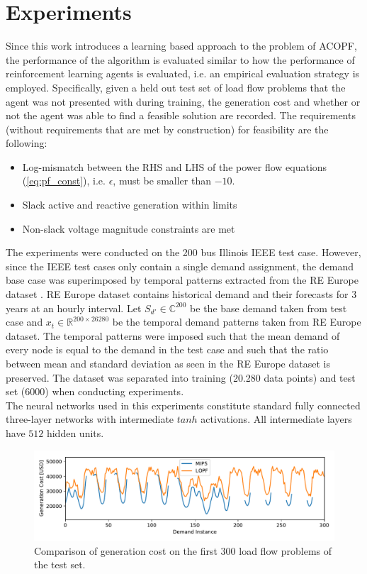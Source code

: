 \section{Experiments}
\label{sec:LOPFexperiments}
Since this work introduces a learning based approach to the problem of ACOPF, the performance of the algorithm is evaluated similar to how the performance of reinforcement learning agents is evaluated, i.e. an empirical evaluation strategy is employed. Specifically, given a held out test set of load flow problems that the agent was not presented with during training, the generation cost and whether or not the agent was able to find a feasible solution are recorded. The requirements (without requirements that are met by construction) for feasibility are the following:
\begin{itemize}
    \item Log-mismatch between the RHS and LHS of the power flow equations (\ref{eq:pf_const}), i.e. $\epsilon$, must be smaller than $-10$.
    \item Slack active and reactive generation within limits
    \item Non-slack voltage magnitude constraints are met
\end{itemize}

The experiments were conducted on the 200 bus Illinois IEEE test case. However, since the IEEE test cases only contain a single demand assignment, the demand base case was superimposed by temporal patterns extracted from the RE Europe dataset \cite{re_europe}. RE Europe dataset contains historical demand and their forecasts for 3 years at an hourly interval. Let $S_{d'} \in \mathbb{C}^{200}$ be the base demand taken from test case and $x_t \in \mathbb{R}^{200 \times 26280}$ be the temporal demand patterns taken from RE Europe dataset. The temporal patterns were imposed such that the mean demand of every node is equal to the demand in the test case and such that the ratio between mean and standard deviation as seen in the RE Europe dataset is preserved. The dataset was separated into training (20.280 data points) and test set (6000) when conducting experiments.\\
The neural networks used in this experiments constitute standard fully connected three-layer networks with intermediate $tanh$ activations. All intermediate layers have $512$ hidden units.

\begin{figure}[!ht]
    \centering
    \includegraphics[width=0.85\linewidth]{krtofl/cost_comapre_uart2.pdf}
    \caption[LOPF: Comparison of generation cost.]{Comparison of generation cost on the first 300 load flow problems of the test set.}
    \label{lopf:cost}
\end{figure}

